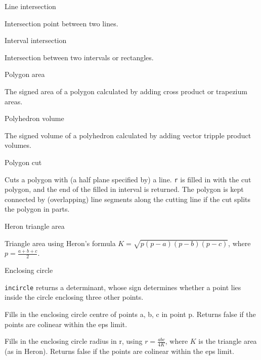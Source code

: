 \begin{algorithm}{Line intersection}

Intersection point between two lines.
\end{algorithm}

\begin{algorithm}{Interval intersection}

Intersection between two intervals or rectangles.
\end{algorithm}

\begin{algorithm}{Polygon area}

The signed area of a polygon calculated by adding cross product or
trapezium areas.
\end{algorithm}

\begin{algorithm}{Polyhedron volume}

The signed volume of a polyhedron calculated by adding vector tripple
product volumes.
\end{algorithm}

\begin{algorithm}{Polygon cut}

Cuts a polygon with (a half plane specified by) a line.
{\tt r} is filled in with the cut polygon, and the end of the filled in
interval is returned. The polygon is kept connected by (overlapping)
line segments along the cutting line if the cut splits the polygon in parts.
\end{algorithm}

\begin{algorithm}{Heron triangle area}

Triangle area using Heron's formula
$K=\sqrt{p(p-a)(p-b)(p-c)}$, where $p=\frac{a+b+c}{2}$.
\end{algorithm}

\begin{algorithm}{Enclosing circle}

{\tt incircle} returns a determinant, whose sign determines whether a point
lies inside the circle enclosing three other points.


Fills in the enclosing circle centre of points a, b, c in point p.
Returns false if the points are colinear within the eps limit.

Fills in the enclosing circle radius in r, using $r=\frac{abc}{4K}$,
where $K$ is the triangle area (as in Heron).
Returns false if the points are colinear within the eps limit.
\end{algorithm}

